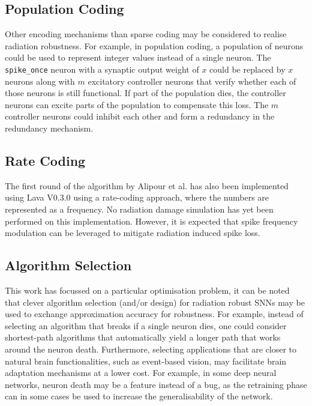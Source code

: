 \subsection{Population Coding}\label{subsec:population_coding}
Other encoding mechanisms than sparse coding may be considered to realise radiation robustness. For example,  in population coding, a population of neurons could be used to represent integer values instead of a single neuron. The \verb+spike_once+ neuron with a synaptic output weight of $x$ could be replaced by $x$ neurons along with $m$ excitatory controller neurons that verify whether each of those neurons is still functional. If part of the population dies, the controller neurons can excite parts of the population to compensate this loss. The $m$ controller neurons could inhibit each other and form a redundancy in the redundancy mechanism.

\subsection{Rate Coding}\label{subsec:rate_coding}
The first round of the algorithm by Alipour et al. has also been implemented using Lava V0.3.0 using a rate-coding approach, where the numbers are represented as a frequency. No radiation damage simulation has yet been performed on this implementation. However, it is expected that spike frequency modulation can be leveraged to mitigate radiation induced spike loss.

\subsection{Algorithm Selection}\label{subsec:algorithm_selection}
This work has focussed on a particular optimisation problem, it can be noted that clever algorithm selection (and/or design) for radiation robust SNNs may be used to exchange approximation accuracy for robustness. For example, instead of selecting an algorithm that breaks if a single neuron dies, one could consider shortest-path algorithms that automatically yield a longer path that works around the neuron death. Furthermore, selecting applications that are closer to natural brain functionalities, such as event-based vision, may facilitate brain adaptation mechanisms at a lower cost. For example, in some deep neural networks, neuron death may be a feature instead of a bug, as the retraining phase can in some cases be used to increase the generalisability of the network. %

